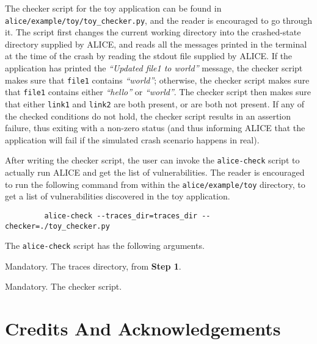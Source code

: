 \documentclass[oneside]{memoir}
\begin{document}
The checker script for the toy application can be found in \verb;alice/example/;\discretionary{}{}{}\verb;toy/toy_checker.py;, and the reader is encouraged to go through it. The script first changes the current working directory into the crashed-state directory supplied by ALICE, and reads all the messages printed in the terminal at the time of the crash by reading the stdout file supplied by ALICE. If the application has printed the \textit{``Updated file1 to \emph{world}''} message, the checker script makes sure that \verb;file1; contains \textit{``world''}; otherwise, the checker script makes sure that \verb;file1; contains either \textit{``hello''} or \textit{``world''}. The checker script then makes sure that either \verb;link1; and \verb;link2; are both present, or are both not present. If any of the checked conditions do not hold, the checker script results in an assertion failure, thus exiting with a non-zero status (and thus informing ALICE that the application will fail if the simulated crash scenario happens in real).

After writing the checker script, the user can invoke the \verb;alice-check; script to actually run ALICE and get the list of vulnerabilities. The reader is encouraged to run the following command from within the \verb;alice/example/toy; directory, to get a list of vulnerabilities discovered in the toy application.

\begin{verbatim}
         alice-check --traces_dir=traces_dir --checker=./toy_checker.py
\end{verbatim}

The \verb;alice-check; script has the following arguments.

\begin{description}[labelindent=0.8cm]\itemsep1pt \parskip0pt 
\item[traces\_dir] Mandatory. The traces directory, from \textbf{Step 1}.
\item[checker] Mandatory. The checker script.
\end{description}

\chapter{Credits And Acknowledgements}
\end{document}
